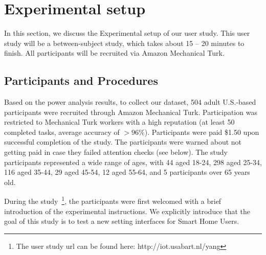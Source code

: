 
\section{Experimental setup}

In this section, we discuss the Experimental setup of our user study. This user study will be a between-subject study, which takes about 15 -- 20 minutes to finish. All participants will be recruited via Amazon Mechanical Turk.

\subsection{Participants and Procedures}
Based on the power analysis results, to collect our dataset, 504 adult U.S.-based participants were recruited through Amazon Mechanical Turk. Participation was restricted to Mechanical Turk workers with a high reputation (at least 50 completed tasks, average accuracy of $> 96\%$). Participants were paid \$1.50 upon successful completion of the study. The participants were warned about not getting paid in case they failed attention checks (see below). The study participants represented a wide range of ages, with 44 aged 18-24, 298 aged 25-34, 116 aged 35-44, 29 aged 45-54, 12 aged 55-64, and 5 participants over 65 years old.

During the study~\footnote{The user study url can be found here: http://iot.usabart.nl/yang}, the participants were first welcomed with a brief introduction of the experimental instructions. We explicitly introduce that the goal of this study is to test a new setting interfaces for Smart Home Users.

